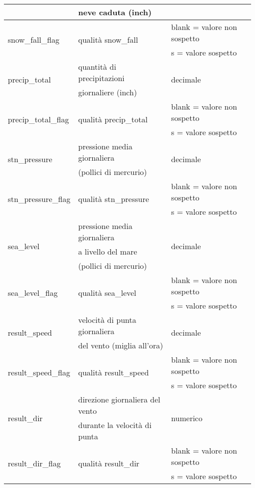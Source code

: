 \begin{longtable}{lll}
	& neve caduta (inch) &\\
	\hline
	\multirow{2}{*}{snow\_fall\_flag}		& \multirow{2}{*}{qualità snow\_fall} &  blank = valore non sospetto \\
	& & s = valore sospetto			 \\ 
	\hline
	\multirow{2}{*}{precip\_total}		& quantità di precipitazioni 	 & 
	\multirow{2}{*}{decimale}			\\ 
	& giornaliere (inch) &\\\hline	
	\multirow{2}{*}{precip\_total\_flag}		& \multirow{2}{*}{qualità precip\_total} &  blank = valore non sospetto \\
	& & s = valore sospetto			 \\ 
	\hline	
	\multirow{2}{*}{stn\_pressure}		& pressione media giornaliera	 & 	
	\multirow{2}{*}{decimale}		\\ 
	&   (pollici di mercurio) &\\
	\hline	
	\multirow{2}{*}{stn\_pressure\_flag}		& \multirow{2}{*}{qualità stn\_pressure} &  blank = valore non sospetto \\
	& & s = valore sospetto			 \\ 
	\hline	
	\multirow{3}{*}{sea\_level}			& pressione media giornaliera 	 & 	
	\multirow{3}{*}{decimale}		\\ 
	& a livello del mare &\\
	& (pollici di mercurio)&\\
	\hline	
	\multirow{2}{*}{sea\_level\_flag}		& \multirow{2}{*}{qualità sea\_level} &  blank = valore non sospetto \\
	& & s = valore sospetto			 \\ 
	\hline
	\multirow{2}{*}{result\_speed}		& velocità di punta giornaliera 	 & 	\multirow{2}{*}{decimale}	\\ 
	& del vento (miglia all'ora) &\\
	\hline	
	\multirow{2}{*}{result\_speed\_flag}		& \multirow{2}{*}{qualità result\_speed} &  blank = valore non sospetto \\
	& & s = valore sospetto			 \\ 
	\hline	
	\multirow{2}{*}{result\_dir}			& direzione giornaliera del vento  & 	\multirow{2}{*}{numerico}	\\ 
	& durante la velocità di punta &\\
	\hline	
	\multirow{2}{*}{result\_dir\_flag}		& \multirow{2}{*}{qualità result\_dir} &  blank = valore non sospetto \\
	& & s = valore sospetto			 \\ 

\end{longtable}
